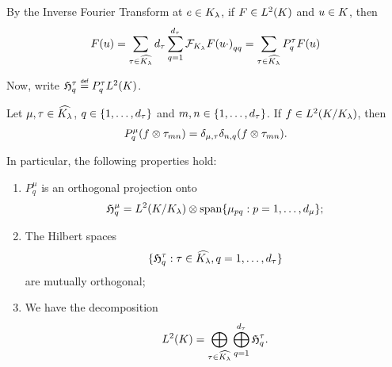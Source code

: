 By the Inverse Fourier Transform at $e \in \IsotropySubgroup{\CompactGroup}{\lambda}$,
if $F \in \Lebesgue{2}{\CompactGroup}$ and $u \in \CompactGroup$, then
\begin{align}
    F(u)
    = \sum_{\tau \in \dualGroup{\IsotropySubgroup{\CompactGroup}{\lambda}}} \dimRep{\tau} \sum_{q = 1}^{\dimRep{\tau}} {\Fourier[\IsotropySubgroup{\CompactGroup}{\lambda}]{F(u \dummy)}}_{qq}
    = \sum_{\tau \in \dualGroup{\IsotropySubgroup{\CompactGroup}{\lambda}}} P^\tau_q F(u)
\end{align}

Now, write $\Hilbert{\tau}{q} \defeq P^\tau_q \Lebesgue{2}{\CompactGroup}$.

\begin{lemma}
    Let $\mu, \tau \in \dualGroup{\IsotropySubgroup{\CompactGroup}{\lambda}}$, $q \in \{1, \dots, \dimRep{\tau}\}$ and $m, n \in \{1, \dots, \dimRep{\tau} \}$.
    If $f \in \Lebesgue{2}{\RightQuotient{\CompactGroup}{\IsotropySubgroup{\CompactGroup}{\lambda}}}$, then
    \begin{align*}
        P^\mu_q (f \otimes \tau_{m n}) = \Kronecker{\mu}{\tau} \Kronecker{n}{q} (f \otimes \tau_{m n}).
    \end{align*}

    In particular, the following properties hold:
    \begin{enumerate}
        \item $P^\mu_q$ is an orthogonal projection onto
            \begin{align*}
                \Hilbert{\mu}{q} =
                    \Lebesgue{2}{\RightQuotient{\CompactGroup}{\IsotropySubgroup{\CompactGroup}{\lambda}}}
                    \otimes
                    \Span \{\mu_{p q} : p = 1, \dots, \dimRep{\mu}\};
            \end{align*}
        \item The Hilbert spaces
            \begin{align*}
                \{\Hilbert{\tau}{q} : \tau \in \dualGroup{\IsotropySubgroup{\CompactGroup}{\lambda}}, q = 1, \dots, \dimRep{\tau} \}
            \end{align*}
            are mutually orthogonal;
        \item We have the decomposition
            \begin{align*}
                \Lebesgue{2}{\CompactGroup} = \bigoplus_{\tau \in \dualGroup{\IsotropySubgroup{\CompactGroup}{\lambda}}} \bigoplus_{q = 1}^{\dimRep{\tau}} \Hilbert{\tau}{q}.
            \end{align*}
    \end{enumerate}
\end{lemma}
